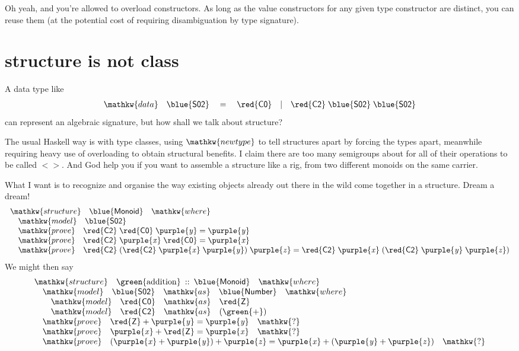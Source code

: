 \documentclass{article}
\newcommand{\data}{\mathkw{data}}
\newcommand{\where}{\mathkw{where}}
\newcommand{\prove}{\mathkw{prove}}
\newcommand{\D}[1]{\mathsf{\blue{#1}}}
\newcommand{\C}[1]{\mathsf{\red{#1}}}
\newcommand{\V}[1]{\mathit{\purple{#1}}}
\newcommand{\F}[1]{\mathrm{\green{#1}}}
\newcommand{\hab}{\:::\:}
\newcommand{\qm}{\mathkw{?}}
\begin{document}
Oh yeah, and you're allowed to overload constructors. As long as the value constructors for any given type constructor are distinct, you can reuse them (at the potential cost of requiring disambiguation by type signature).



\section{structure is not class}

A data type like
\[\begin{array}{l}
\data\quad\D{S02}\quad = \quad \C{C0}\quad | \quad \C{C2}\;\D{S02}\;\D{S02}
\end{array}\]
can represent an algebraic signature, but how shall we talk about structure?

The usual Haskell way is with type classes, using $\mathkw{newtype}$
to tell structures apart by forcing the types apart, meanwhile
requiring heavy use of overloading to obtain structural benefits. I
claim there are too many semigroups about for all of their operations
to be called $<>$.  And God help you if you want to
assemble a structure like a rig, from two different monoids on the
same carrier.

What I want is to recognize and organise the way existing objects
already out there in the wild come together in a structure.
Dream a dream!
\[\begin{array}{l}
\mathkw{structure}\quad \D{Monoid}\quad\where\\
\quad\mathkw{model}\quad \D{S02}\\
\quad\prove\quad \C{C2}\;\C{C0}\;\V{y} = \V{y}\\
\quad\prove\quad \C{C2}\;\V{x}\;\C{C0} = \V{x}\\
\quad\prove\quad \C{C2}\;(\C{C2}\;\V{x}\;\V{y})\;\V{z} =
   \C{C2}\;\V{x}\;(\C{C2}\;\V{y}\;\V{z})\\
\end{array}\]
We might then say
\[\begin{array}{l}
\mathkw{structure}\quad \F{addition}\hab\D{Monoid}\quad\where\\
\quad\mathkw{model}\quad \D{S02}\quad\mathkw{as}\quad \D{Number}\quad\where\\
\quad \quad \mathkw{model}\quad\C{C0}\quad\mathkw{as}\quad\C{Z}\\
\quad \quad \mathkw{model}\quad\C{C2}\quad\mathkw{as}\quad(\F{+})\\
\quad\prove\quad \C{Z}+\V{y} = \V{y}\quad\qm\\
\quad\prove\quad \V{x}+\C{Z} = \V{x}\quad\qm\\
\quad\prove\quad (\V{x}+\V{y})+\V{z} = \V{x}+(\V{y}+\V{z})\quad\qm\\
\end{array}\]
\end{document}
